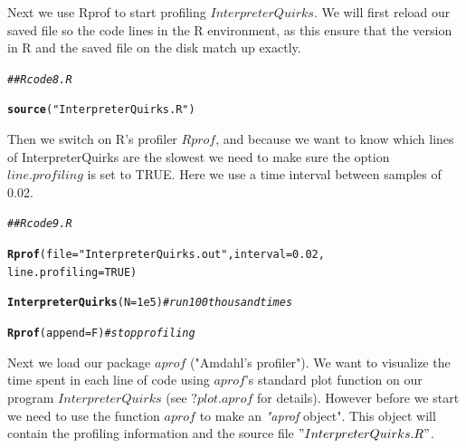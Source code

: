 \documentclass{article}\usepackage[]{graphicx}\usepackage[]{color}
\makeatletter
\newcommand{\hlnum}[1]{\textcolor[rgb]{0.686,0.059,0.569}{#1}}%
\newcommand{\hlstr}[1]{\textcolor[rgb]{0.192,0.494,0.8}{#1}}%
\newcommand{\hlcom}[1]{\textcolor[rgb]{0.678,0.584,0.686}{\textit{#1}}}%
\newcommand{\hlstd}[1]{\textcolor[rgb]{0.345,0.345,0.345}{#1}}%
\newcommand{\hlkwc}[1]{\textcolor[rgb]{0.333,0.667,0.333}{#1}}%
\newcommand{\hlkwd}[1]{\textcolor[rgb]{0.737,0.353,0.396}{\textbf{#1}}}%
\newenvironment{kframe}{%
 \def\at@end@of@kframe{}%
 \ifinner\ifhmode%
  \def\at@end@of@kframe{\end{minipage}}%
  \begin{minipage}{\columnwidth}%
 \fi\fi%
 \def\FrameCommand##1{\hskip\@totalleftmargin \hskip-\fboxsep
 \colorbox{shadecolor}{##1}\hskip-\fboxsep
     \hskip-\linewidth \hskip-\@totalleftmargin \hskip\columnwidth}%
 \MakeFramed {\advance\hsize-\width
   \@totalleftmargin\z@ \linewidth\hsize
   \@setminipage}}%
 {\par\unskip\endMakeFramed%
 \at@end@of@kframe}
\newenvironment{knitrout}{}{} %
\makeatother
\begin{document}
Next we use Rprof to start profiling $InterpreterQuirks$. We will first reload our saved file so the code lines in the R environment, as this ensure that the version in R and the saved file on the disk match up exactly. 

\begin{knitrout}
\color{fgcolor}\begin{kframe}
\begin{alltt}
\hlcom{## Rcode8.R}

\hlkwd{source}\hlstd{(}\hlstr{"InterpreterQuirks.R"}\hlstd{)}
\end{alltt}
\end{kframe}
\end{knitrout}

Then we switch on R's profiler $Rprof$, and because we want to know which lines of InterpreterQuirks are the slowest we need to make sure the option $line.profiling$ is set to TRUE. Here we use a time interval between samples of 0.02.

\begin{knitrout}
\color{fgcolor}\begin{kframe}
\begin{alltt}
\hlcom{## Rcode9.R}

\hlkwd{Rprof}\hlstd{(}\hlkwc{file}\hlstd{=}\hlstr{"InterpreterQuirks.out"}\hlstd{,}\hlkwc{interval} \hlstd{=} \hlnum{0.02}\hlstd{,}
          \hlkwc{line.profiling} \hlstd{=}\hlnum{TRUE}\hlstd{)}

\hlkwd{InterpreterQuirks}\hlstd{(}\hlkwc{N}\hlstd{=}\hlnum{1e5}\hlstd{)} \hlcom{# run 100 thousand times}

\hlkwd{Rprof}\hlstd{(}\hlkwc{append}\hlstd{=F)} \hlcom{# stop profiling}
\end{alltt}
\end{kframe}
\end{knitrout}

Next we load our package $aprof$ ("Amdahl's profiler"). We want to visualize the time spent in each line of code using $aprof$'s standard plot function on our program $InterpreterQuirks$ (see $?plot.aprof$ for details). However before we 
start we need to use the function $aprof$ to make an \textit{"aprof} object". This object will contain the profiling information and the source file $"InterpreterQuirks.R"$. 
\end{document}
